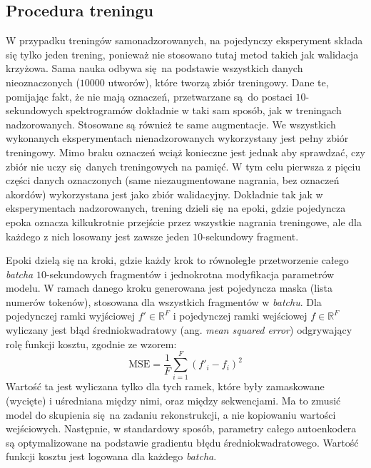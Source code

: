 \subsection{Procedura treningu}

W przypadku treningów samonadzorowanych, na pojedynczy eksperyment składa się tylko jeden trening, ponieważ nie stosowano tutaj metod takich jak walidacja krzyżowa. Sama nauka odbywa się na podstawie wszystkich danych nieoznaczonych ($10000$ utworów), które tworzą zbiór treningowy. Dane te, pomijając fakt, że nie mają oznaczeń, przetwarzane są do postaci $10$-sekundowych spektrogramów dokładnie w taki sam sposób, jak w treningach nadzorowanych. Stosowane są również te same augmentacje. We wszystkich wykonanych eksperymentach nienadzorowanych wykorzystany jest pełny zbiór treningowy. Mimo braku oznaczeń wciąż konieczne jest jednak aby sprawdzać, czy zbiór nie uczy się danych treningowych na pamięć. W tym celu pierwsza z pięciu części danych oznaczonych (same niezaugmentowane nagrania, bez oznaczeń akordów) wykorzystana jest jako zbiór walidacyjny. Dokładnie tak jak w eksperymentach nadzorowanych, trening dzieli się na epoki, gdzie pojedyncza epoka oznacza kilkukrotnie przejście przez wszystkie nagrania treningowe, ale dla każdego z nich losowany jest zawsze jeden $10$-sekundowy fragment.

Epoki dzielą się na kroki, gdzie każdy krok to równoległe przetworzenie całego \emph{batcha} $10$-sekundowych fragmentów i jednokrotna modyfikacja parametrów modelu. W ramach danego kroku generowana jest pojedyncza maska (lista numerów tokenów), stosowana dla wszystkich fragmentów w \emph{batchu}. Dla pojedynczej ramki wyjściowej $f' \in \mathbb{R}^F$ i pojedynczej ramki wejściowej $f \in \mathbb{R}^F$ wyliczany jest błąd średniokwadratowy (ang. \emph{mean squared error}) odgrywający rolę funkcji kosztu, zgodnie ze wzorem:
\begin{equation}
    \textrm{MSE} = \frac{1}{F} \sum_{i=1}^{F} (f'_{i} - f_{i})^2
\end{equation}
Wartość ta jest wyliczana tylko dla tych ramek, które były zamaskowane (wycięte) i uśredniana między nimi, oraz między sekwencjami. Ma to zmusić model do skupienia się na zadaniu rekonstrukcji, a nie kopiowaniu wartości wejściowych.  Następnie, w standardowy sposób, parametry całego autoenkodera są optymalizowane na podstawie gradientu błędu średniokwadratowego.  Wartość funkcji kosztu jest logowana dla każdego \emph{batcha}.

